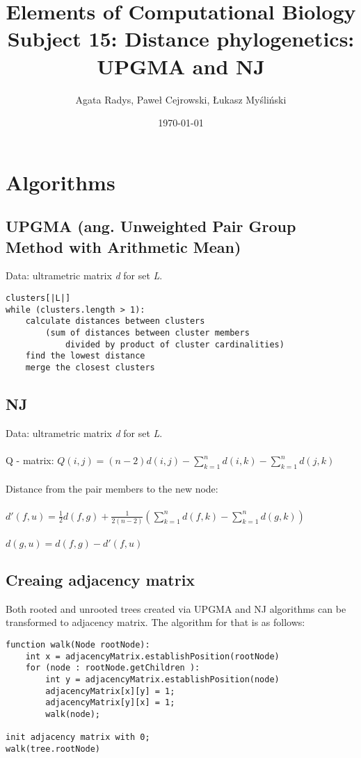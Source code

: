 \documentclass[a4paper,10pt]{article}
\title{Elements of Computational Biology\\ \Large
Subject 15: Distance phylogenetics: UPGMA and NJ}
\author{Agata Radys, Paweł Cejrowski, Łukasz Myśliński}
\date{\today}
\begin{document}
\maketitle

\section{Algorithms}

\subsection{UPGMA (ang. Unweighted Pair Group Method with Arithmetic Mean)}
Data: ultrametric matrix \textit{d} for set \textit{L}.
\begin{lstlisting}[caption={UPGMA pseudocode}]
clusters[|L|]
while (clusters.length > 1):
    calculate distances between clusters
        (sum of distances between cluster members
            divided by product of cluster cardinalities)
    find the lowest distance
    merge the closest clusters
\end{lstlisting}

\subsection{NJ}
Data: ultrametric matrix \textit{d} for set \textit{L}.\\ \\
Q - matrix: $ Q(i,j) = (n-2)d(i,j) - \sum_{k=1}^{n} d(i,k) - \sum_{k=1}^{n} d(j,k)$ \\ \\
Distance from the pair members to the new node: \\ \\
$d'(f,u) = \frac{1}{2}d(f,g) + \frac{1}{2(n-2)}(\sum_{k=1}^n d(f,k) - \sum_{k=1}^n d(g,k))$ \\ \\
$d(g,u) = d(f,g) - d'(f,u)$

\subsection{Creaing adjacency matrix}
Both rooted and unrooted trees created via UPGMA and NJ algorithms can be transformed to adjacency matrix. The algorithm for that is as follows:
\begin{lstlisting}[caption={Tree to adjacency matrix.}]
function walk(Node rootNode):
    int x = adjacencyMatrix.establishPosition(rootNode)
    for (node : rootNode.getChildren ):
        int y = adjacencyMatrix.establishPosition(node)
        adjacencyMatrix[x][y] = 1;
        adjacencyMatrix[y][x] = 1;
        walk(node);

init adjacency matrix with 0;
walk(tree.rootNode)
\end{lstlisting}
\end{document}
